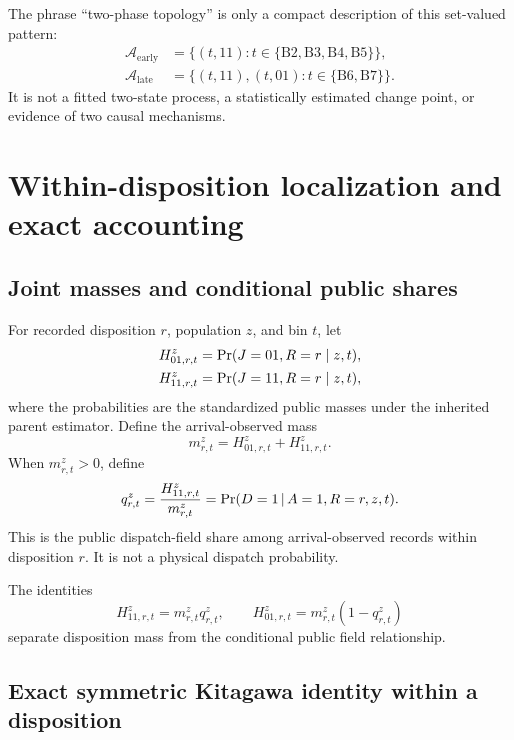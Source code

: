 \documentclass[11pt]{article}
\begin{document}
The phrase \enquote{two-phase topology} is only a compact description of this set-valued pattern:
\begin{align}
\mathcal A_{\mathrm{early}}&=\{(t,11):t\in\{\mathrm{B2,B3,B4,B5}\}\},\\
\mathcal A_{\mathrm{late}}&=\{(t,11),(t,01):t\in\{\mathrm{B6,B7}\}\}.
\end{align}
It is not a fitted two-state process, a statistically estimated change point, or evidence of two causal mechanisms.

\section{Within-disposition localization and exact accounting}
\label{sec:disposition}

\subsection{Joint masses and conditional public shares}
\label{sec:joint_masses}

For recorded disposition $r$, population $z$, and bin $t$, let
\begin{align}
H^z_{01,r,t}&=\Pr(J=01,R=r\mid z,t),\\
H^z_{11,r,t}&=\Pr(J=11,R=r\mid z,t),
\end{align}
where the probabilities are the standardized public masses under the inherited parent estimator. Define the arrival-observed mass
\begin{equation}
m^z_{r,t}=H^z_{01,r,t}+H^z_{11,r,t}.
\label{eq:mr}
\end{equation}
When $m^z_{r,t}>0$, define
\begin{equation}
q^z_{r,t}=
\frac{H^z_{11,r,t}}{m^z_{r,t}}
=\Pr(D=1\,|\, A=1,R=r,z,t).
\label{eq:qr}
\end{equation}
This is the public dispatch-field share among arrival-observed records within disposition $r$. It is not a physical dispatch probability.

The identities
\begin{equation}
H^z_{11,r,t}=m^z_{r,t}q^z_{r,t},
\qquad
H^z_{01,r,t}=m^z_{r,t}(1-q^z_{r,t})
\label{eq:Hfactor}
\end{equation}
separate disposition mass from the conditional public field relationship.

\subsection{Exact symmetric Kitagawa identity within a disposition}
\end{document}
